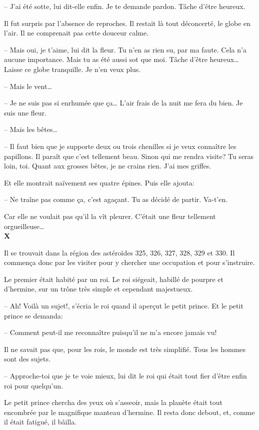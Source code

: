 \begin{Parallel}[p]{}{}
{-- J'ai été sotte, lui dit-elle enfin. Je te demande
pardon. Tâche d'être heureux.

Il fut surpris par l'absence de reproches. Il restait là tout déconcerté, le globe en l'air. Il ne comprenait pas cette douceur calme.

-- Mais oui, je t'aime, lui dit la fleur. Tu n'en as
rien su, par ma faute. Cela n'a aucune importance.
Mais tu as été aussi sot que moi. Tâche d'être heureux\ldots{} Laisse ce globe tranquille. Je n'en veux plus.

-- Mais le vent\ldots{}

-- Je ne suis pas si enrhumée que ça\ldots{} L'air frais
de la nuit me fera du bien. Je suis une fleur.

-- Mais les bêtes\ldots{}

-- Il faut bien que je supporte deux ou trois chenilles si je veux connaître les papillons. Il paraît que
c'est tellement beau. Sinon qui me rendra visite? Tu
seras loin, toi. Quant aux grosses bêtes, je ne crains
rien. J'ai mes griffes.

Et elle montrait naïvement ses quatre épines. Puis
elle ajouta:

-- Ne traîne pas comme ça, c'est agaçant. Tu as
décidé de partir. Va-t'en.

Car elle ne voulait pas qu'il la vît pleurer. C'était
une fleur tellement orgueilleuse\ldots{}\\

\textbf{X}

Il se trouvait dans la région des astéroïdes 325,
326, 327, 328, 329 et 330. Il commença donc par les
visiter pour y chercher une occupation et pour s'instruire.

Le premier était habité par un roi. Le roi siégeait,
habillé de pourpre et d'hermine, sur un trône très
simple et cependant majestueux.

-- Ah! Voilà un sujet!, s'écria le roi quand il aperçut le petit prince. Et le petit prince se demanda:

-- Comment peut-il me reconnaître puisqu'il ne
m'a encore jamais vu!

Il ne savait pas que, pour les rois, le monde est
très simplifié. Tous les hommes sont des sujets.

-- Approche-toi que je te voie mieux, lui dit le
roi qui était tout fier d'être enfin roi pour quelqu'un.

Le petit prince chercha des yeux où s'asseoir, mais
la planète était tout encombrée par le magnifique
manteau d'hermine. Il resta donc debout, et,
comme il était fatigué, il bâilla.

}
\end{Parallel}
